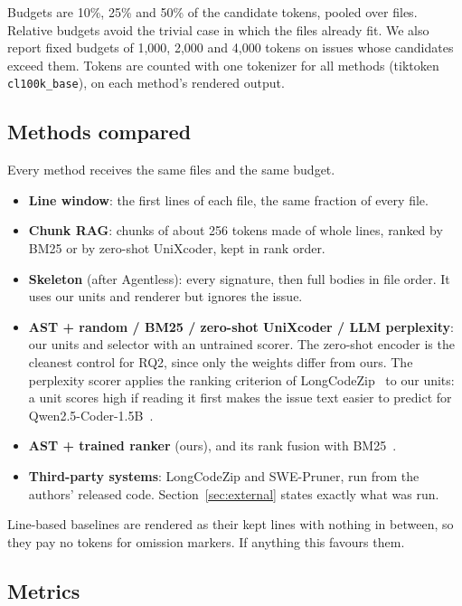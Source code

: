 Budgets are 10\%, 25\% and 50\% of the candidate tokens, pooled over files. Relative budgets avoid the trivial case in which the files already fit. We also report fixed budgets of 1{,}000, 2{,}000 and 4{,}000 tokens on issues whose candidates exceed them. Tokens are counted with one tokenizer for all methods (tiktoken \texttt{cl100k\_base}), on each method's rendered output.

\subsection{Methods compared}

Every method receives the same files and the same budget.

\begin{itemize}
\item \textbf{Line window}: the first lines of each file, the same fraction of every file.
\item \textbf{Chunk RAG}: chunks of about 256 tokens made of whole lines, ranked by BM25 or by zero-shot UniXcoder, kept in rank order.
\item \textbf{Skeleton} (after Agentless): every signature, then full bodies in file order. It uses our units and renderer but ignores the issue.
\item \textbf{AST + random / BM25 / zero-shot UniXcoder / LLM perplexity}: our units and selector with an untrained scorer. The zero-shot encoder is the cleanest control for RQ2, since only the weights differ from ours. The perplexity scorer applies the ranking criterion of LongCodeZip~\cite{longcodezip} to our units: a unit scores high if reading it first makes the issue text easier to predict for Qwen2.5-Coder-1.5B~\cite{qwencoder}.
\item \textbf{AST + trained ranker} (ours), and its rank fusion with BM25~\cite{rrf}.
\item \textbf{Third-party systems}: LongCodeZip and SWE-Pruner, run from the authors' released code. Section~\ref{sec:external} states exactly what was run.
\end{itemize}

Line-based baselines are rendered as their kept lines with nothing in between, so they pay no tokens for omission markers. If anything this favours them.

\subsection{Metrics}


